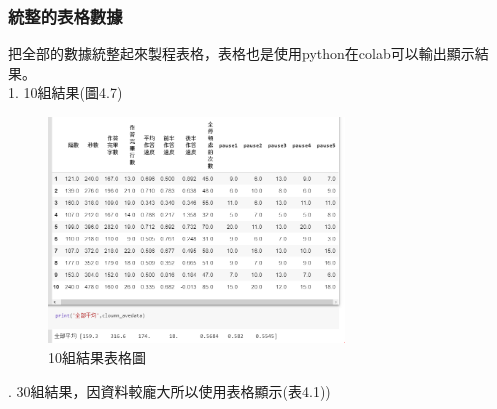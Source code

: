\subsubsection{統整的表格數據}
把全部的數據統整起來製程表格，表格也是使用python在colab可以輸出顯示結果。\\
1. 10組結果(圖4.7)
	\begin{figure}[H] 
	\centering 
	\includegraphics[width=0.7\textwidth]{4_7.png} 
	\caption{10組結果表格圖} 
	\label{Fig.4.7} 
	\end{figure}
. 30組結果，因資料較龐大所以使用表格顯示(表4.1))\\
